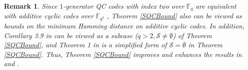 \documentclass[journal]{IEEEtran}
\newtheorem{remark}{Remark}
\begin{document}
\begin{remark}\label{improve_bound}
	Since $1$-generator QC codes with index two over $\mathbb{F}_q$ are equivalent with additive cyclic codes over $\mathbb{F}_{q^2}$ \cite{GuanAdditive2023}, Theorem \ref{SQCBound} also can be viewed as bounds on the minimum Hamming distance on additive cyclic codes.
	In addition, Corollary 3.9 in \cite{dastbasteh2023polynomial} can be viewed as a subcase ($q>2,\mathcal{S} \ne\emptyset$) of Theorem \ref{SQCBound},  
	and Theorem 1 in \cite{GuanAdditive2023} is a simplified form of $\mathcal{S} =\emptyset$ in Theorem \ref{SQCBound}.
	Thus, Theorem \ref{SQCBound} improves and enhances the results in \cite{dastbasteh2023polynomial} and \cite{GuanAdditive2023}. 
\end{remark}
\end{document}
